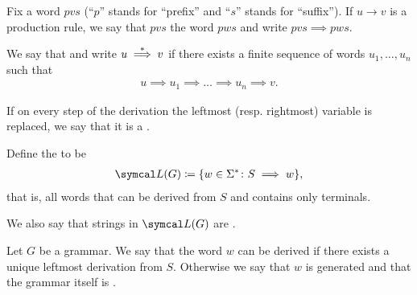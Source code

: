 \begin{definition}\label{def:grammar_derivation}\cite[104,108]{Sipser2013}
  Fix a word $pvs$ (\enquote{$p$} stands for \enquote{prefix} and \enquote{$s$} stands for \enquote{suffix}). If $u \to v$ is a production rule, we say that $pvs$  the word $pws$ and write $pvs \implies pws$.

  We say that  and write $u \overset * \implies v$ if there exists a finite sequence of words $u_1, \ldots, u_n$ such that
  \begin{align*}
    u \implies u_1 \implies \ldots \implies u_n \implies v.
  \end{align*}

  If on every step of the derivation the leftmost (resp. rightmost) variable is replaced, we say that it is a .

  Define the  to be
  \begin{align*}
    \Cal{L}(G) \coloneqq \{ w \in \Sigma^* \colon S \implies w \},
  \end{align*}
  that is, all words that can be derived from $S$ and contains only terminals.

  We also say that strings in $\Cal{L}(G)$ are .
\end{definition}

\begin{definition}\label{def:ambiguous_grammar}\cite[definition 2.7]{Sipser2013}
  Let $G$ be a grammar. We say that the word $w$ can be derived  if there exists a unique leftmost derivation from $S$. Otherwise we say that $w$ is generated  and that the grammar itself is .
\end{definition}

